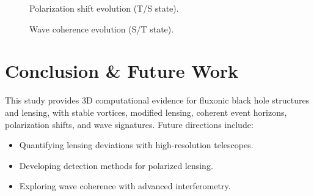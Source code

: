 \documentclass[11pt]{article}
\begin{document}
\begin{figure}[ht]
    \centering
    \caption{Polarization shift evolution (T/S state).}
    \label{fig:pol_shift}
\end{figure}

\begin{figure}[ht]
    \centering
    \caption{Wave coherence evolution (S/T state).}
    \label{fig:wave_coh}
\end{figure}

\section{Conclusion \& Future Work}
This study provides 3D computational evidence for fluxonic black hole structures and lensing, with stable vortices, modified lensing, coherent event horizons, polarization shifts, and wave signatures. Future directions include:
\begin{itemize}
    \item Quantifying lensing deviations with high-resolution telescopes.
    \item Developing detection methods for polarized lensing.
    \item Exploring wave coherence with advanced interferometry.
\end{itemize}
\end{document}
